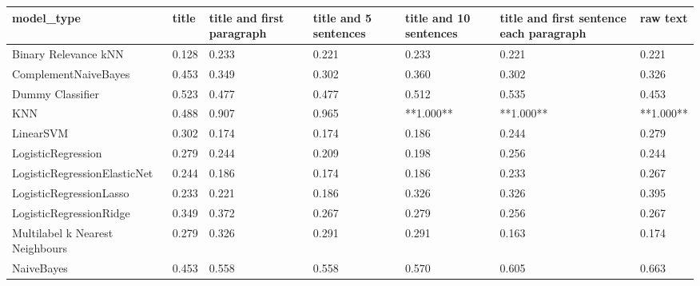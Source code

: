 \begin{tabular}{lllllll}
\toprule
                     model\_type & title & title and first paragraph & title and 5 sentences & title and 10 sentences & title and first sentence each paragraph &  raw text \\
\midrule
           Binary Relevance kNN & 0.128 &                     0.233 &                 0.221 &                  0.233 &                                   0.221 &     0.221 \\
           ComplementNaiveBayes & 0.453 &                     0.349 &                 0.302 &                  0.360 &                                   0.302 &     0.326 \\
               Dummy Classifier & 0.523 &                     0.477 &                 0.477 &                  0.512 &                                   0.535 &     0.453 \\
                            KNN & 0.488 &                     0.907 &                 0.965 &              **1.000** &                               **1.000** & **1.000** \\
                      LinearSVM & 0.302 &                     0.174 &                 0.174 &                  0.186 &                                   0.244 &     0.279 \\
             LogisticRegression & 0.279 &                     0.244 &                 0.209 &                  0.198 &                                   0.256 &     0.244 \\
   LogisticRegressionElasticNet & 0.244 &                     0.186 &                 0.174 &                  0.186 &                                   0.233 &     0.267 \\
        LogisticRegressionLasso & 0.233 &                     0.221 &                 0.186 &                  0.326 &                                   0.326 &     0.395 \\
        LogisticRegressionRidge & 0.349 &                     0.372 &                 0.267 &                  0.279 &                                   0.256 &     0.267 \\
Multilabel k Nearest Neighbours & 0.279 &                     0.326 &                 0.291 &                  0.291 &                                   0.163 &     0.174 \\
                     NaiveBayes & 0.453 &                     0.558 &                 0.558 &                  0.570 &                                   0.605 &     0.663 \\

\end{tabular}
